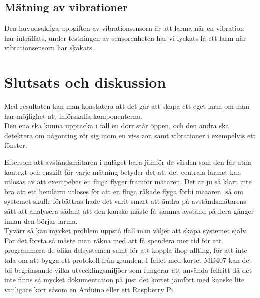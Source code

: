 \documentclass{article}
\begin{document}
\subsection{Mätning av vibrationer}
Den huvudsakliga uppgiften av vibrationsensorn är att larma när en vibration har inträffats, under testningen av sensorenheten har vi lyckats få ett larm när vibrationsensorn har skakats.


\section{Slutsats och diskussion}
Med resultaten kan man konstatera att det går att skapa ett eget larm om man har möjlighet att införskaffa komponenterna.\\

\noindent
Den ena ska kunna upptäcka i fall en dörr står öppen, och den andra ska detektera om någonting rör sig inom en viss zon samt vibrationer i exempelvis ett fönster. 


\noindent
Eftersom att avståndsmätaren i nuläget bara jämför de värden som den får utan kontext och enskilt för varje mätning betyder det att det centrala larmet kan utlösas av att exempelvis en fluga flyger framför mätaren.
Det är ju så klart inte bra att ett hemlarm utlöses för att en fluga råkade flyga förbi mätaren, så om systemet skulle förbättras hade det varit smart att ändra på avståndsmätarens sätt att analysera sådant att den kanske måste få samma avstånd på flera gånger innan den börjar larma.\\

\noindent
Tyvärr så kan mycket problem uppstå ifall man väljer att skapa systemet själv.
För det första så måste man räkna med att få spendera mer tid för att programmera de olika delsystemen samt för att koppla ihop allting, för att inte tala om att bygga ett protokoll från grunden.
I fallet med kortet MD407 kan det bli begränsande vilka utvecklingsmiljöer som fungerar att använda felfritt då det inte finns så mycket dokumentation på just det kortet jämfört med kanske lite vanligare kort såsom en Arduino eller ett Raspberry Pi.\\
\end{document}
